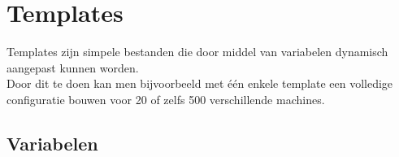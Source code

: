 \chapter{Templates}

Templates zijn simpele bestanden die door middel van variabelen dynamisch aangepast kunnen worden.\\
Door dit te doen kan men bijvoorbeeld met één enkele template een volledige configuratie bouwen voor 20 of zelfs 500 verschillende machines.\\

\section{Variabelen}
